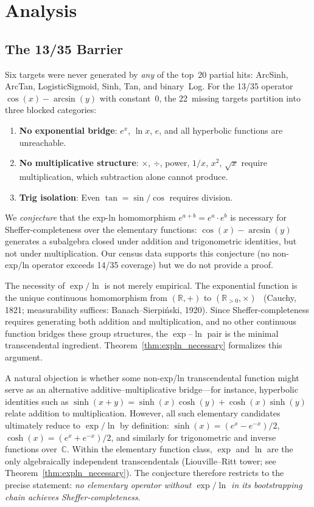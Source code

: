 \documentclass[10pt,twocolumn]{article}
\theoremstyle{remark}
\begin{document}
\section{Analysis}

\subsection{The 13/35 Barrier}

Six targets were never generated by \emph{any} of the top~20 partial hits: ArcSinh, ArcTan, LogisticSigmoid, Sinh, Tan, and binary~Log. For the 13/35 operator $\cos(x) - \arcsin(y)$ with constant~0, the 22~missing targets partition into three blocked categories:
\begin{enumerate}
\item \textbf{No exponential bridge}: $e^x$, $\ln x$, $e$, and all hyperbolic functions are unreachable.
\item \textbf{No multiplicative structure}: $\times$, $\div$, power, $1/x$, $x^2$, $\sqrt{x}$ require multiplication, which subtraction alone cannot produce.
\item \textbf{Trig isolation}: Even $\tan = \sin/\cos$ requires division.
\end{enumerate}

We \emph{conjecture} that the exp-ln homomorphism $e^{a+b} = e^a \cdot e^b$ is necessary for Sheffer-completeness over the elementary functions: $\cos(x) - \arcsin(y)$ generates a subalgebra closed under addition and trigonometric identities, but not under multiplication. Our census data supports this conjecture (no non-exp/ln operator exceeds 14/35 coverage) but we do not provide a proof.

The necessity of $\exp/\ln$ is not merely empirical. The exponential function is the unique continuous homomorphism from $(\mathbb{R},+)$ to $(\mathbb{R}_{>0},\times)$~\cite{aczel1966} (Cauchy, 1821; measurability suffices: Banach--Sierpi\'{n}ski, 1920). Since Sheffer-completeness requires generating both addition and multiplication, and no other continuous function bridges these group structures, the $\exp$--$\ln$ pair is the minimal transcendental ingredient. Theorem~\ref{thm:expln_necessary} formalizes this argument.

\smallskip
A natural objection is whether some non-exp/ln transcendental function might serve as an alternative additive--multiplicative bridge---for instance, hyperbolic identities such as $\sinh(x+y) = \sinh(x)\cosh(y) + \cosh(x)\sinh(y)$ relate addition to multiplication. However, all such elementary candidates ultimately reduce to $\exp/\ln$ by definition: $\sinh(x) = (e^x - e^{-x})/2$, $\cosh(x) = (e^x + e^{-x})/2$, and similarly for trigonometric and inverse functions over~$\mathbb{C}$. Within the elementary function class, $\exp$ and $\ln$ are the only algebraically independent transcendentals (Liouville--Ritt tower; see Theorem~\ref{thm:expln_necessary}). The conjecture therefore restricts to the precise statement: \emph{no elementary operator without $\exp/\ln$ in its bootstrapping chain achieves Sheffer-completeness}.
\end{document}
